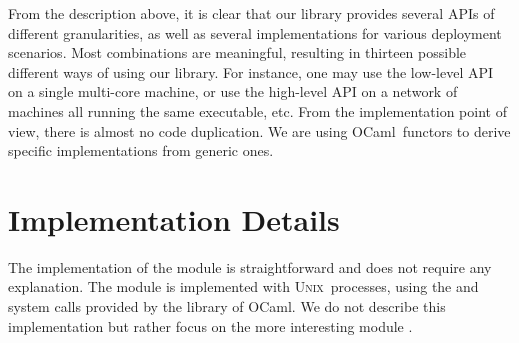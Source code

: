 \documentclass{llncs}
\newcommand{\Ocaml}{OCaml}
\newcommand{\unix}{\textsc{Unix}}
\begin{document}
From  the description above, it is clear that our library provides
several APIs of different granularities, as well as several
implementations for various deployment scenarios. 
Most combinations are meaningful, resulting in
thirteen possible different ways of using our library.
For instance, one may use the low-level API on a single multi-core
machine, or use the high-level API on a network of machines all
running the same executable, etc.
From the implementation point of view, there is almost no code
duplication. We are using \Ocaml\ functors to derive specific
implementations from generic ones.

\section{Implementation Details}\label{sec:implem}

The implementation of the 
module is straightforward and does not require any explanation.
The  module is implemented with \unix\ processes, using
the  and  system calls provided by the 
library of \Ocaml. We do not describe this implementation but
rather focus on the more interesting module .
\end{document}
